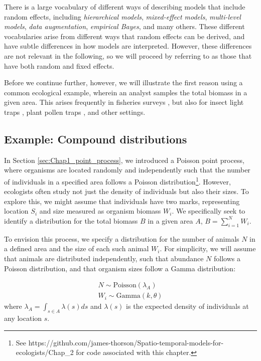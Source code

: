 There is a large vocabulary of different ways of describing models that include random effects, including \textit{hierarchical models}, \textit{mixed-effect models}, \textit{multi-level models}, \textit{data augmentation}, \textit{empirical Bayes}, and many others.  These different vocabularies arise from different ways that random effects can be derived, and have subtle differences in how models are interpreted.  However, these differences are not relevant in the following, so we will proceed by referring to  as those that have both random and fixed effects. 

Before we continue further, however, we will illustrate the first reason using a common ecological example, wherein an analyst samples the total biomass in a given area.  This arises frequently in fisheries surveys \cite{maureaud_are_2021}, but also for insect light traps \cite{zhou_long-term_2023}, plant pollen traps \cite{giesecke_early_2010}, and other settings.  

\subsection{Example: Compound distributions} \label{sec:Chap2_compound_distribution}

In Section \ref{sec:Chap1_point_process}, we introduced a Poisson point process, where organisms are located randomly and independently such that the number of individuals in a specified area follows a Poisson distribution\footnote{See https://github.com/james-thorson/Spatio-temporal-models-for-ecologists/Chap\_2 for code associated with this chapter.}.  However, ecologists often study not just the density of individuals but also their sizes.  To explore this, we might assume that individuals have two marks, representing location \(S_i\) and size measured as organism biomass \(W_i\).  We specifically seek to identify a distribution for the total biomass \(B\) in a given area \(A\), \( B = \sum_{i=1}^{N} W_i \). 

To envision this process, we specify a distribution for the number of animals \(N\) in a defined area and the size of each such animal \(W_i\).  For simplicity, we will assume that animals are distributed independently, such that abundance \(N\) follows a Poisson distribution, and that organism sizes follow a Gamma distribution:

\begin{equation} \label{eq:Chap2_CPG}
\begin{gathered}
    N \sim \mathrm{Poisson}( \lambda_A ) \\
    W_i \sim \mathrm{Gamma}( k, \theta )  
\end{gathered}
\end{equation}
where \( \lambda_A = \int_{s \in A} \lambda(s) ds \) and \(\lambda(s)\) is the expected density of individuals at any location \(s\).  

